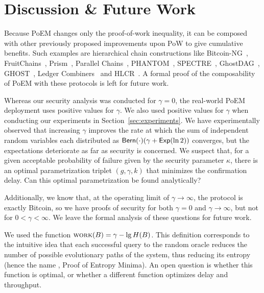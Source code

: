 \section{Discussion \& Future Work}

\noindent
\myparagraph[Composability]
Because PoEM changes only the proof-of-work inequality, it can be composed with other
previously proposed improvements upon PoW to give cumulative benefits.
Such examples are hierarchical chain constructions like
Bitcoin-NG~\cite{bitcoinng}, Fruit\-Chains~\cite{fruitchains},
Prism~\cite{prism}, Parallel Chains~\cite{parallel-chains},
PHANTOM~\cite{phantom}, SPECTRE~\cite{spectre}, GhostDAG~\cite{ghostdag},
GHOST~\cite{ghost},
Ledger Combiners~\cite{ledger-combiners} and HLCR~\cite{hlcr}.
A formal proof of the composability of PoEM with these protocols is left for future work.

\noindent
\myparagraph[Bias]
Whereas our security analysis was conducted for $\gamma = 0$,
the real-world PoEM deployment uses positive values for $\gamma$.
We also used positive values for $\gamma$ when conducting our experiments
in Section~\ref{sec:experiments}. We have experimentally observed that
increasing $\gamma$ improves the rate at which the
sum of independent random variables each distributed as $\textsf{Bern}(\cdot) (\gamma + \textsf{Exp}(\ln2))$
converges, but the expectations deteriorate as far as security is concerned.
We suspect that, for a given acceptable probability of failure given by the security
parameter $\kappa$, there is an optimal parametrization triplet $(g, \gamma, k)$ that
minimizes the confirmation delay. Can this optimal parametrization be found analytically?

Additionally,
we know that, at the operating limit of $\gamma \to \infty$, the protocol
is exactly Bitcoin, so we have proofs of security for both
$\gamma = 0$ and $\gamma \to \infty$, but not for $0 < \gamma < \infty$.
We leave the formal analysis of these questions for future work.

\noindent
{}
We used the function $\textsc{work}(B) = \gamma - \lg H(B)$.
This definition corresponds to the intuitive idea that
each successful query to the random oracle reduces the number of possible evolutionary
paths of the system, thus reducing its entropy
(hence the name \emph{\poem}, Proof of Entropy Minima).
An open question
is whether this function is optimal, or whether
a different function optimizes delay and throughput.

